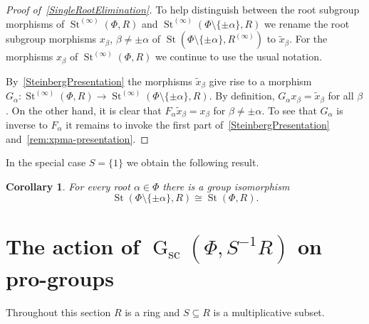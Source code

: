 \documentclass[oneside, 11pt]{amsart}
\numberwithin{equation}{section}
\newtheorem{corollary}[lemma]{Corollary}
\theoremstyle{definition}
\theoremstyle{remark}
\DeclareMathOperator\St{St}
\DeclareMathOperator\GG{G}
\begin{document}
\begin{proof}[Proof of~\cref{SingleRootElimination}]
To help distinguish between the root subgroup morphisms of $\St^{(\infty)}(\Phi, R)$ and $\St^{(\infty)}(\Phi\setminus\{\pm\alpha\}, R)$ we rename the root subgroup morphisms $x_\beta$, $\beta\neq\pm\alpha$ of $\St(\Phi\setminus\{\pm\alpha\}, R^{(\infty)})$ to $\widetilde{x}_{\beta}$. For the morphisms $x_\beta$ of $\St^{(\infty)}(\Phi, R)$ we continue to use the usual notation. 

By~\cref{SteinbergPresentation} the morphisms $\widetilde{x}_{\beta}$ give rise to a morphism $G_\alpha \colon \St^{(\infty)}(\Phi, R) \to \St^{(\infty)}(\Phi\setminus\{\pm\alpha\}, R)$. By definition, $G_\alpha x_\beta = \widetilde{x}_\beta$ for all $\beta$. On the other hand, it is clear that $F_\alpha \widetilde{x}_\beta = x_\beta$ for $\beta\neq \pm\alpha$. To see that $G_\alpha$ is inverse to $F_\alpha$ it remains to invoke the first part of~\cref{SteinbergPresentation} and~\cref{rem:xpma-presentation}.
\end{proof}

In the special case $S = \{1\}$ we obtain the following result.
\begin{corollary}  For every root \(\alpha \in \Phi\) there is a group isomorphism \[\St(\Phi\setminus\{\pm \alpha\}, R) \cong \St(\Phi, R).\] \end{corollary}

\section{The action of \texorpdfstring{$\GG_{\mathrm{sc}}(\Phi, S^{-1}R)$}{G(Ф, R)} on pro-groups} \label{sec:local-action}
Throughout this section \(R\) is a ring and \(S \subseteq R\) is a multiplicative subset.
\end{document}
